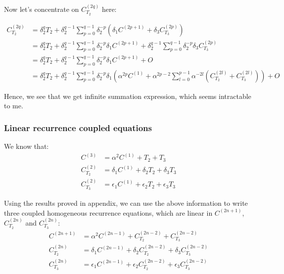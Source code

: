 \documentclass[11pt,a4paper]{article}
\begin{document}
Now let's concentrate on $C^{(2q)}_{T_2}$ here:

\begin{align}
C^{(2q)}_{T_2} &= \delta^{q}_2 T_2 +  \delta_2^{q-1} \sum_{p=0}^{q-1} \delta_2^{-p}   (\delta_1 C^{(2p+1)} + \delta_3  C^{(2p)}_{T_3})\\
 &= \delta^{q}_2 T_2 +  \delta_2^{q-1} \sum_{p=0}^{q-1} \delta_2^{-p}    \delta_1 C^{(2p+1)} + \delta_2^{q-1}  \sum_{p=0}^{q-1} \delta_2^{-p}  \delta_3  C^{(2p)}_{T_3}\\
 &= \delta^{q}_2 T_2 +  \delta_2^{q-1} \sum_{p=0}^{q-1} \delta_2^{-p}    \delta_1 C^{(2p+1)} + O\\
& =\delta^{q}_2 T_2 +  \delta_2^{q-1} \sum_{p=0}^{q-1} \delta_2^{-p}   \delta_1 ( \alpha^{2p} C^{(1)} +\alpha^{2p-2} \sum_{l=0}^{p-1} \alpha^{-2l} (C^{(2l)}_{T_2} + C^{(2l)}_{T_3})) + O 
\end{align}

Hence, we see that we get infinite summation expression, which seems intractable to me.
\subsubsection{Linear recurrence coupled equations}
We know that:
\begin{align}
C^{(3)} &=   \alpha^2  C^{(1)}  +T_2  +T_3\\
C^{(2)}_{T_2}&= \delta_1 C^{(1)} + \delta_2 T_2 + \delta_3 T_3 \\
C^{(2)}_{T_3}&= \epsilon_1 C^{(1)} + \epsilon_2 T_2 + \epsilon_3 T_3 
\end{align}

Using the results proved in appendix, we can use the above information to write three coupled homogeneous recurrence equations, which are linear in $C^{(2n+1)}$, $C^{(2n)}_{T_2}$ and $C^{(2n)}_{T_3} $:
\begin{equation}
\boxed{
\begin{aligned}
C^{(2n+1)}&= \alpha^2  C^{(2n-1)} +C^{(2n-2)}_{T_2} + C^{(2n-2)}_{T_3} \\
C^{(2n)}_{T_2} &=\delta_1  C^{(2n-1)} + \delta_2 C^{(2n-2)}_{T_2} + \delta_3 C^{(2n-2)}_{T_3} \\
C^{(2n)}_{T_3} &=\epsilon_1  C^{(2n-1)} + \epsilon_2 C^{(2n-2)}_{T_2} + \epsilon_3  C^{(2n-2)}_{T_3}
\end{aligned}
}
\end{equation}
\end{document}

